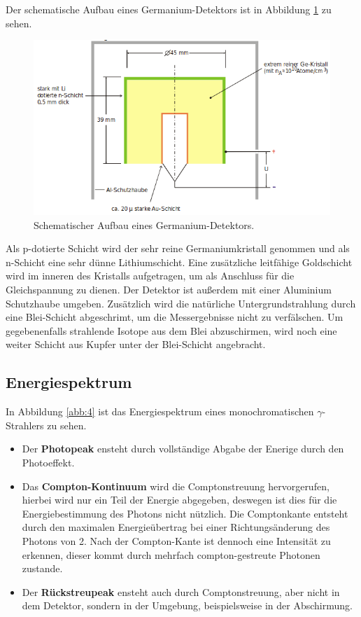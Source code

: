 Der schematische Aufbau eines Germanium-Detektors ist in Abbildung \ref{abb:3}
zu sehen.

\begin{figure}
  \centering
  \includegraphics[scale=0.5]{AufbauDetektor.png}
  \caption{Schematischer Aufbau eines Germanium-Detektors. \cite{Q1}}
  \label{abb:3}
\end{figure}

Als p-dotierte Schicht wird der sehr reine Germaniumkristall genommen und als
n-Schicht eine sehr dünne Lithiumschicht. Eine zusätzliche leitfähige
Goldschicht wird im inneren des Kristalls aufgetragen, um als Anschluss für
die Gleichspannung zu dienen. Der Detektor ist außerdem mit einer Aluminium
Schutzhaube umgeben. Zusätzlich wird die natürliche Untergrundstrahlung durch
eine Blei-Schicht abgeschrimt, um die Messergebnisse nicht zu verfälschen.
Um gegebenenfalls strahlende Isotope aus dem Blei abzuschirmen, wird noch eine
weiter Schicht aus Kupfer unter der Blei-Schicht angebracht.

\subsection{Energiespektrum}
In Abbildung \ref{abb:4} ist das Energiespektrum eines monochromatischen
$\gamma$-Strahlers zu sehen.
\begin{itemize}
  \item Der \textbf{Photopeak} ensteht durch vollständige Abgabe der Enerige
  durch den Photoeffekt.
  \item Das \textbf{Compton-Kontinuum} wird die Comptonstreuung hervorgerufen,
  hierbei wird nur ein Teil der Energie abgegeben, deswegen ist dies für die
  Energiebestimmung des Photons nicht nützlich. Die Comptonkante entsteht durch
  den maximalen Energieübertrag bei einer Richtungsänderung des Photons von 2\pi.
  Nach der Compton-Kante ist dennoch eine Intensität zu erkennen, dieser kommt
  durch mehrfach compton-gestreute Photonen zustande.
  \item Der \textbf{Rückstreupeak} ensteht auch durch Comptonstreuung, aber
  nicht in dem Detektor, sondern in der Umgebung, beispielsweise in der
  Abschirmung.
\end{itemize}

